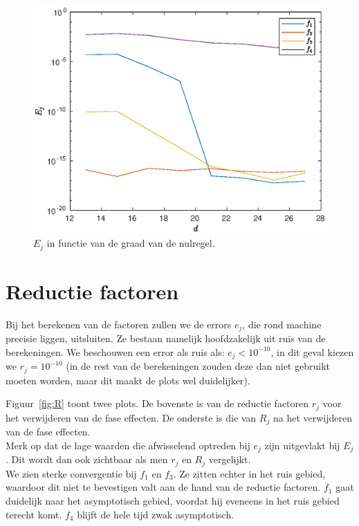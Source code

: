 \documentclass{article}
\begin{document}
\begin{figure}[H]
\centering
\includegraphics[width=\linewidth]{E.eps}
\caption{$E_j$ in functie van de graad van de nulregel.} \label{fig:E}
\end{figure}

\section{Reductie factoren}
Bij het berekenen van de factoren zullen we de errors $e_j$, die rond machine precisie liggen, uitsluiten. Ze bestaan namelijk hoofdzakelijk uit ruis van de berekeningen. We beschouwen een error als ruis als: $e_j < 10^{-10}$, in dit geval kiezen we $r_j = 10^{-10}$ (in de rest van de berekeningen zouden deze dan niet gebruikt moeten worden, maar dit maakt de plots wel duidelijker).

Figuur~\ref{fig:R} toont twee plots. De bovenste is van de reductie factoren $r_j$ voor het verwijderen van de fase effecten. De onderste is die van $R_j$ na het verwijderen van de fase effecten. \\

Merk op dat de lage waarden die afwisselend optreden bij $e_j$ zijn uitgevlakt bij $E_j$. Dit wordt dan ook zichtbaar als men $r_j$ en $R_j$ vergelijkt.\\

We zien sterke convergentie bij $f_1$ en $f_3$. Ze zitten echter in het ruis gebied, waardoor dit niet te bevestigen valt aan de hand van de reductie factoren. $f_1$ gaat duidelijk naar het asymptotisch gebied, voordat hij eveneens in het ruis gebied terecht komt. $f_4$ blijft de hele tijd zwak asymptotisch.
\end{document}
